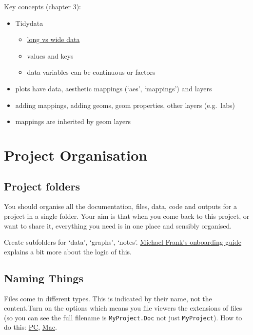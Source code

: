 \documentclass[
]{book}
\providecommand{\tightlist}{%
  \setlength{\itemsep}{0pt}\setlength{\parskip}{0pt}}
\begin{document}
Key concepts (chapter 3):

\begin{itemize}
\tightlist
\item
  Tidydata

  \begin{itemize}
  \tightlist
  \item
    \href{https://en.wikipedia.org/wiki/Wide_and_narrow_data}{long vs wide data}
  \item
    values and keys
  \item
    data variables can be continuous or factors
  \end{itemize}
\item
  plots have data, aesthetic mappings (`aes', `mappings') and layers
\item
  adding mappings, adding geoms, geom properties, other layers (e.g.~labs)
\item
  mappings are inherited by geom layers
\end{itemize}

\hypertarget{project-organisation}{%
\chapter{Project Organisation}\label{project-organisation}}

\hypertarget{project-folders}{%
\section{Project folders}\label{project-folders}}

You should organise all the documentation, files, data, code and outputs for a project in a single folder. Your aim is that when you come back to this project, or want to share it, everything you need is in one place and sensibly organised.

Create subfolders for `data', `graphs', `notes'. \href{http://babieslearninglanguage.blogspot.co.uk/2017/01/onboarding.html}{Michael Frank's onboarding guide} explains a bit more about the logic of this.

\hypertarget{naming-things}{%
\section{Naming Things}\label{naming-things}}

Files come in different types. This is indicated by their name, not the content.Turn on the options which means you file viewers the extensions of files (so you can see the full filename is \texttt{MyProject.Doc} not just \texttt{MyProject}). How to do this: \href{https://www.howtogeek.com/205086/beginner-how-to-make-windows-show-file-extensions/}{PC}, \href{https://support.apple.com/en-gb/guide/mac-help/mchlp2304/mac}{Mac}.
\end{document}
